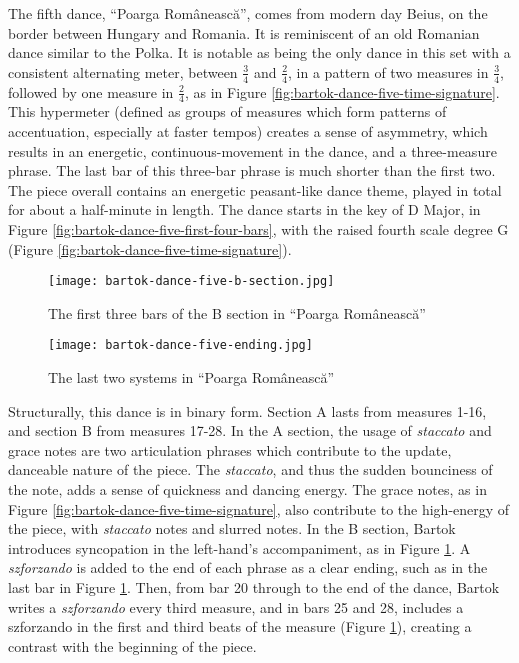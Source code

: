 The fifth dance, ``Poarga Românească'', comes from modern day Beius, on the border between Hungary and Romania. It is reminiscent of an old Romanian dance similar to the Polka. It is notable as being the only dance in this set with a consistent alternating meter, between $\frac{3}{4}$ and $\frac{2}{4}$, in a pattern of two measures in $\frac{3}{4}$, followed by one measure in $\frac{2}{4}$, as in Figure \ref{fig:bartok-dance-five-time-signature}\autocite{Lung_2016}. This hypermeter (defined as groups of measures which form patterns of accentuation, especially at faster tempos\autocite{Hughes_Gotham_Hamm_2021}) creates a sense of asymmetry, which results in an energetic, continuous-movement in the dance, and a three-measure phrase. The last bar of this three-bar phrase is much shorter than the first two. The piece overall contains an energetic peasant-like dance theme, played in total for about a half-minute in length. The dance starts in the key of D Major, in Figure \ref{fig:bartok-dance-five-first-four-bars}\autocite{Lung_2016}, with the raised fourth scale degree G\musSharp{} (Figure \ref{fig:bartok-dance-five-time-signature}\autocite{Lung_2016}).

\begin{figure}
  \centering
  \texttt{[image: bartok-dance-five-b-section.jpg]}
  \caption[The first three bars in the B section of ``Poarga Românească'' in Bartok's \textit{Romanian Folk Dances, Sz. 56, BB 68}]{The first three bars of the B section in ``Poarga Românească''}
  \label{fig:bartok-dance-five-b-section}
\end{figure}

\begin{figure}
  \centering
  \texttt{[image: bartok-dance-five-ending.jpg]}
  \caption[The last two systems in ``Poarga Românească'' of Bartok's \textit{Romanian Folk Dances, Sz. 56, BB 68}]{The last two systems in ``Poarga Românească''}
  \label{fig:bartok-dance-five-ending}
\end{figure}


Structurally, this dance is in binary form. Section A lasts from measures 1-16, and section B from measures 17-28. In the A section, the usage of \textit{staccato} and grace notes are two articulation phrases which contribute to the update, danceable nature of the piece. The \textit{staccato}, and thus the sudden bounciness of the note, adds a sense of quickness and dancing energy. The grace notes, as in Figure \ref{fig:bartok-dance-five-time-signature}\autocite{Lung_2016}, also contribute to the high-energy of the piece, with \textit{staccato} notes and slurred notes. In the B section, Bartok introduces syncopation in the left-hand's accompaniment, as in Figure \ref{fig:bartok-dance-five-b-section}\autocite{Lung_2016}. A \textit{szforzando} is added to the end of each phrase as a clear ending, such as in the last bar in Figure \ref{fig:bartok-dance-five-b-section}\autocite{Lung_2016}. Then, from bar 20 through to the end of the dance, Bartok writes a \textit{szforzando} every third measure, and in bars 25 and 28, includes a szforzando in the first and third beats of the measure (Figure \ref{fig:bartok-dance-five-b-section}\autocite{Lung_2016}), creating a contrast with the beginning of the piece. 

